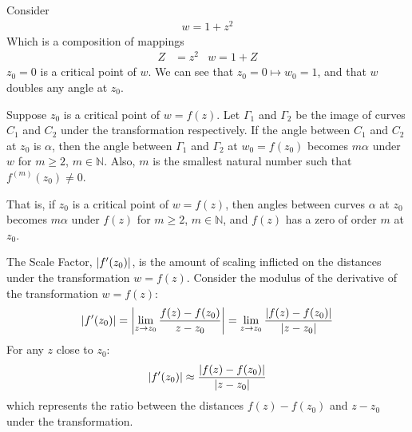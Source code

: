 \documentclass[12pt, english]{book}
\makeatletter
\renewenvironment{proof}[1][\proofname]{\par
	\pushQED{\qed}%
	\normalfont \topsep6\p@\@plus6\p@\relax
	\list{}{%
		\settowidth{\leftmargin}{\itshape\proofname:\hskip\labelsep}%
		\setlength{\labelwidth}{0pt}%
		\setlength{\itemindent}{-\leftmargin}%
		}%
	\item[\hskip\labelsep\itshape#1\@addpunct{:}]\ignorespaces
	}{\popQED\endlist\@endpefalse}
\makeatother
\begin{document}
	\begin{example}
		Consider 
		\begin{align*}
			w = 1 + z^2
		\end{align*}
		Which is a composition of mappings
		\begin{align*}
			Z &= z^2	&	w = 1 + Z
		\end{align*}
		\(z_0 = 0\) is a critical point of \(w\). We can see that \(z_0 = 0 \mapsto w_0 = 1\), and that \(w\) doubles any angle at \(z_0\). 
	\end{example}

	\begin{corollary}
		Suppose \(z_0\) is a critical point of \(w = f(z)\). Let \(\Gamma_1\) and \(\Gamma_2\) be the image of curves \(C_1\) and \(C_2\) under the transformation respectively. If the angle between \(C_1\) and \(C_2\) at \(z_0\) is \(\alpha\), then the angle between \(\Gamma_1\) and \(\Gamma_2\) at \(w_0 = f(z_0)\) becomes \(m \alpha\) under \(w\) for \(m \geq 2\), \(m \in \mathbb{N}\). Also, \(m\) is the smallest natural number such that \(f^{(m)}(z_0) \neq 0\). 
		
		That is, if \(z_0\) is a critical point of \(w = f(z)\), then angles between curves \(\alpha\) at \(z_0\) becomes \(m\alpha\) under \(f(z)\) for \(m \geq 2\), \(m \in \mathbb{N}\), and \(f(z)\) has a zero of order \(m\) at \(z_0\).
	\end{corollary}
	\begin{proof}
	\end{proof}
	
	\begin{definition}
		\label{Scale Factor Definition - Complex}
		The Scale Factor, \(\abs{f'(z_0)}\), is the amount of scaling inflicted on the distances under the transformation \(w = f(z)\). Consider the modulus of the derivative of the transformation \(w = f(z)\):
		\begin{align*}
			\abs{f'(z_0)}
			= \abs{\lim_{z \rightarrow z_0} \frac{f(z) - f(z_0)}{z - z_0}}
			= \lim_{z \rightarrow z_0} \frac{\abs{f(z) - f(z_0)}}{\abs{z - z_0}}
		\end{align*}
		For any \(z\) close to \(z_0\):
		\begin{align*}
			\abs{f'(z_0)} \approx \frac{\abs{f(z) - f(z_0)}}{\abs{z - z_0}}
		\end{align*}
		which represents the ratio between the distances \(f(z) - f(z_0)\) and \(z - z_0\) under the transformation.
	\end{definition}
	
\end{document}
